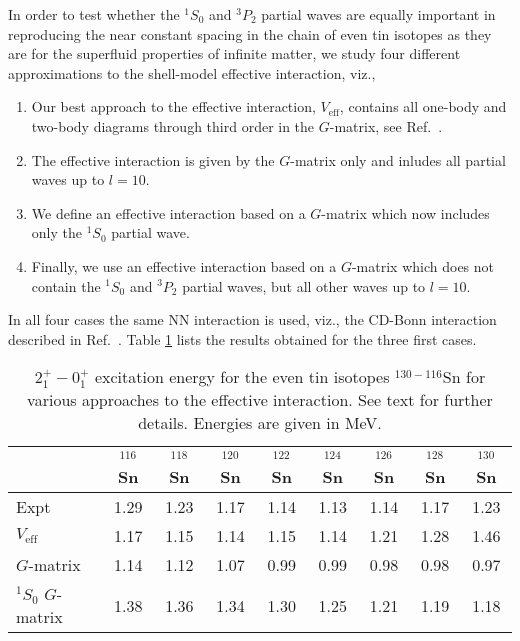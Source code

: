 In order to test whether the $^1S_0$ and $^3P_2$ partial waves are equally
important in reproducing the near constant spacing in the chain
of even tin isotopes as they are for the superfluid properties of infinite matter,
we study four different approximations to the shell-model
effective interaction, viz.,
\begin{enumerate}
  \item Our best approach to the effective interaction, $V_{\mathrm{eff}}$, contains
        all one-body and two-body diagrams through third order in the $G$-matrix, 
        see Ref.\ \cite{ehho97}. 
  \item The effective interaction is given by the $G$-matrix only and inludes
        all partial waves up to $l=10$.
  \item We define an effective  interaction based on a $G$-matrix which now includes
        only the $^1S_0$ partial wave.
  \item Finally, we use an effective interaction based on a $G$-matrix which does
        not contain the  $^1S_0$ and $^3P_2$ partial waves, but all other waves
        up to $l=10$.  
\end{enumerate}
In all four cases the same NN interaction is used, viz., 
the CD-Bonn interaction described in Ref.\ \cite{cdbonn}.
Table \ref{tab:table1} lists the results obtained for the three first cases.  
\begin{table}[t]
\begin{center}
\caption{ $2^+_1-0^+_1$ excitation energy for the 
even tin isotopes $^{130-116}$Sn for various approaches
to the effective interaction. See text for further details. 
Energies are given in MeV. \label{tab:table1}}
\begin{tabular}{lcccccccc}\hline
 & {$^{116}$Sn} & {$^{118}$Sn} & {$^{120}$Sn} &{$^{122}$Sn} & {$^{124}$Sn} & {$^{126}$Sn} & {$^{128}$Sn} & {$^{130}$Sn} \\ \hline
Expt & 1.29 & 1.23 & 1.17 & 1.14 & 1.13 & 1.14 & 1.17 & 1.23 \\
$V_{\mathrm{eff}}$ & 1.17 & 1.15 & 1.14 & 1.15 & 1.14 & 1.21 & 1.28 & 1.46 \\
$G$-matrix &1.14 & 1.12& 1.07 & 0.99 & 0.99 & 0.98 & 0.98 & 0.97  \\
$^1S_0$ $G$-matrix &1.38 &1.36 &1.34 &1.30 & 1.25& 1.21 &1.19 &1.18 \\\hline
\end{tabular}
\end{center}

\end{table}

